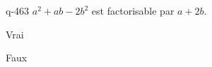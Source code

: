 \begin{truefalse}{q-463}
$a^2+ab-2b^2$ est factorisable par $a+2b$.
\item* Vrai
\item Faux
\end{truefalse}

